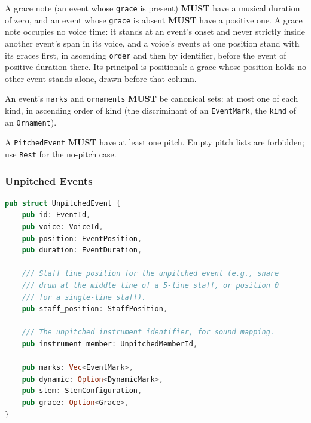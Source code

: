\documentclass[11pt,letterpaper]{report}
\newcounter{requirement}[chapter]
\newcommand{\MUST}{\textbf{MUST}}
\begin{document}
\begin{requirement}
  \label{req:graph:grace-timing}
  A grace note (an event whose \texttt{grace} is present) \MUST{} have a
  musical duration of zero, and an event whose \texttt{grace} is absent
  \MUST{} have a positive one. A grace note occupies no voice time: it
  stands at an event's onset and never strictly inside another event's
  span in its voice, and a voice's events at one position stand with its
  graces first, in ascending \texttt{order} and then by identifier, before
  the event of positive duration there. Its principal is positional: a
  grace whose position holds no other event stands alone, drawn before
  that column.
\end{requirement}

\begin{requirement}
  \label{req:graph:event-mark-sets}
  An event's \texttt{marks} and \texttt{ornaments} \MUST{} be canonical
  sets: at most one of each kind, in ascending order of kind (the
  discriminant of an \texttt{EventMark}, the \texttt{kind} of an
  \texttt{Ornament}).
\end{requirement}

\begin{requirement}
  \label{req:graph:pitched-event-nonempty}
  A \texttt{PitchedEvent} \MUST{} have at least one pitch. Empty
  pitch lists are forbidden; use \texttt{Rest} for the no-pitch case.
\end{requirement}

\subsubsection{Unpitched Events}

\begin{lstlisting}[language=Rust]
pub struct UnpitchedEvent {
    pub id: EventId,
    pub voice: VoiceId,
    pub position: EventPosition,
    pub duration: EventDuration,

    /// Staff line position for the unpitched event (e.g., snare
    /// drum at the middle line of a 5-line staff, or position 0
    /// for a single-line staff).
    pub staff_position: StaffPosition,

    /// The unpitched instrument identifier, for sound mapping.
    pub instrument_member: UnpitchedMemberId,

    pub marks: Vec<EventMark>,
    pub dynamic: Option<DynamicMark>,
    pub stem: StemConfiguration,
    pub grace: Option<Grace>,
}
\end{lstlisting}
\end{document}
